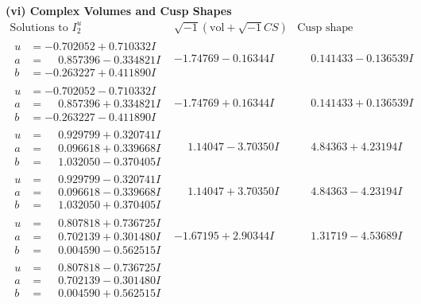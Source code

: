 \documentclass[1p]{elsarticle_modified}
\theoremstyle{definition}
\newcommand{\I}{\sqrt{-1}}
\begin{document}
\newpage\flushleft \textbf{(vi) Complex Volumes and Cusp Shapes}
$$\begin{array}{c|c|c}  
\text{Solutions to }I^u_{2}& \I (\text{vol} + \sqrt{-1}CS) & \text{Cusp shape}\\
 \hline 
\begin{aligned}
u &= -0.702052 + 0.710332 I \\
a &= \phantom{-}0.857396 - 0.334821 I \\
b &= -0.263227 + 0.411890 I\end{aligned}
 & -1.74769 - 0.16344 I & \phantom{-}0.141433 - 0.136539 I \\ \hline\begin{aligned}
u &= -0.702052 - 0.710332 I \\
a &= \phantom{-}0.857396 + 0.334821 I \\
b &= -0.263227 - 0.411890 I\end{aligned}
 & -1.74769 + 0.16344 I & \phantom{-}0.141433 + 0.136539 I \\ \hline\begin{aligned}
u &= \phantom{-}0.929799 + 0.320741 I \\
a &= \phantom{-}0.096618 + 0.339668 I \\
b &= \phantom{-}1.032050 - 0.370405 I\end{aligned}
 & \phantom{-}1.14047 - 3.70350 I & \phantom{-}4.84363 + 4.23194 I \\ \hline\begin{aligned}
u &= \phantom{-}0.929799 - 0.320741 I \\
a &= \phantom{-}0.096618 - 0.339668 I \\
b &= \phantom{-}1.032050 + 0.370405 I\end{aligned}
 & \phantom{-}1.14047 + 3.70350 I & \phantom{-}4.84363 - 4.23194 I \\ \hline\begin{aligned}
u &= \phantom{-}0.807818 + 0.736725 I \\
a &= \phantom{-}0.702139 + 0.301480 I \\
b &= \phantom{-}0.004590 - 0.562515 I\end{aligned}
 & -1.67195 + 2.90344 I & \phantom{-}1.31719 - 4.53689 I \\ \hline\begin{aligned}
u &= \phantom{-}0.807818 - 0.736725 I \\
a &= \phantom{-}0.702139 - 0.301480 I \\
b &= \phantom{-}0.004590 + 0.562515 I\end{aligned}

\end{array}$$
\end{document}
